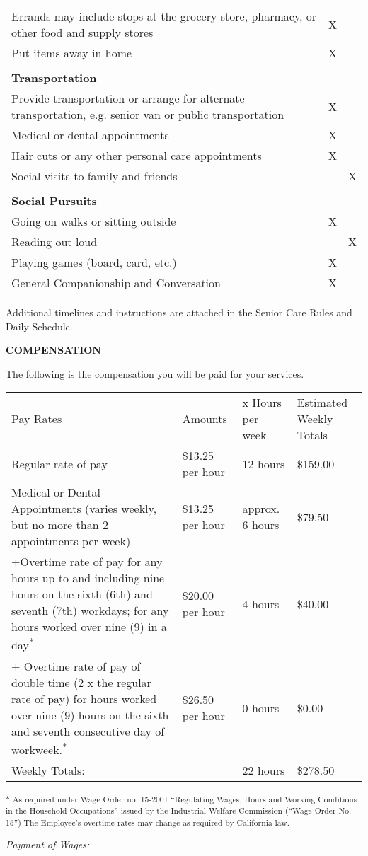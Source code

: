 \documentclass[]{article}
\begin{document}
\begin{longtable}[c]{@{}lll@{}}
Errands may include stops at the grocery store, pharmacy, or other food
and supply stores & X &\tabularnewline
Put items away in home & X &\tabularnewline
& &\tabularnewline
\textbf{Transportation} & &\tabularnewline
Provide transportation or arrange for alternate transportation, e.g.
senior van or public transportation & X &\tabularnewline
Medical or dental appointments & X &\tabularnewline
Hair cuts or any other personal care appointments & X &\tabularnewline
Social visits to family and friends & & X\tabularnewline
& &\tabularnewline
\textbf{Social Pursuits} & &\tabularnewline
Going on walks or sitting outside & X &\tabularnewline
Reading out loud & & X\tabularnewline
Playing games (board, card, etc.) & X &\tabularnewline
General Companionship and Conversation & X &\tabularnewline
\bottomrule
\end{longtable}

Additional timelines and instructions are attached in the Senior Care
Rules and Daily Schedule.

\textbf{COMPENSATION}

The following is the compensation you will be paid for your services.

\begin{longtable}[c]{@{}llll@{}}
\toprule
Pay Rates & Amounts & x Hours per week & Estimated Weekly
Totals\tabularnewline
Regular rate of pay & \$13.25 per hour & 12 hours &
\$159.00\tabularnewline
Medical or Dental Appointments (varies weekly, but no more than 2
appointments per week) & \$13.25 per hour & approx. 6 hours &
\$79.50\tabularnewline
+Overtime rate of pay for any hours up to and including nine hours on
the sixth (6th) and seventh (7th) workdays; for any hours worked over
nine (9) in a day\textsuperscript{*} & \$20.00 per hour & 4 hours &
\$40.00\tabularnewline
+ Overtime rate of pay of double time (2 x the regular rate of pay) for
hours worked over nine (9) hours on the sixth and seventh consecutive
day of workweek.\textsuperscript{*} & \$26.50 per hour & 0 hours &
\$0.00\tabularnewline
Weekly Totals: & & 22 hours & \$278.50\tabularnewline
\bottomrule
\end{longtable}

\textsuperscript{* As required under Wage Order no. 15-2001 ``Regulating
Wages, Hours and Working Conditions in the Household Occupations''
issued by the Industrial Welfare Commission (``Wage Order No. 15'') The
Employee's overtime rates may change as required by California law. }

\emph{Payment of Wages:}
\end{document}
